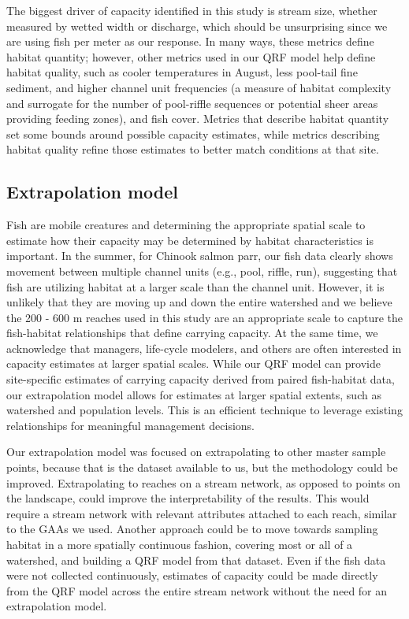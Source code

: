 \documentclass[
  12pt,
]{article}
\begin{document}
The biggest driver of capacity identified in this study is stream size, whether measured by wetted width or discharge, which should be unsurprising since we are using fish per meter as our response. In many ways, these metrics define habitat quantity; however, other metrics used in our QRF model help define habitat quality, such as cooler temperatures in August, less pool-tail fine sediment, and higher channel unit frequencies (a measure of habitat complexity and surrogate for the number of pool-riffle sequences or potential sheer areas providing feeding zones), and fish cover. Metrics that describe habitat quantity set some bounds around possible capacity estimates, while metrics describing habitat quality refine those estimates to better match conditions at that site.

\hypertarget{extrapolation-model}{%
\subsection{Extrapolation model}\label{extrapolation-model}}

Fish are mobile creatures and determining the appropriate spatial scale to estimate how their capacity may be determined by habitat characteristics is important. In the summer, for Chinook salmon parr, our fish data clearly shows movement between multiple channel units (e.g., pool, riffle, run), suggesting that fish are utilizing habitat at a larger scale than the channel unit. However, it is unlikely that they are moving up and down the entire watershed and we believe the 200 - 600 m reaches used in this study are an appropriate scale to capture the fish-habitat relationships that define carrying capacity. At the same time, we acknowledge that managers, life-cycle modelers, and others are often interested in capacity estimates at larger spatial scales. While our QRF model can provide site-specific estimates of carrying capacity derived from paired fish-habitat data, our extrapolation model allows for estimates at larger spatial extents, such as watershed and population levels. This is an efficient technique to leverage existing relationships for meaningful management decisions.

Our extrapolation model was focused on extrapolating to other master sample points, because that is the dataset available to us, but the methodology could be improved. Extrapolating to reaches on a stream network, as opposed to points on the landscape, could improve the interpretability of the results. This would require a stream network with relevant attributes attached to each reach, similar to the GAAs we used. Another approach could be to move towards sampling habitat in a more spatially continuous fashion, covering most or all of a watershed, and building a QRF model from that dataset. Even if the fish data were not collected continuously, estimates of capacity could be made directly from the QRF model across the entire stream network without the need for an extrapolation model.
\end{document}
